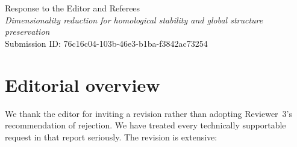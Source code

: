 \documentclass[11pt]{article}
\begin{document}
\begin{center}
{\Large Response to the Editor and Referees}\\[0.5em]
\emph{Dimensionality reduction for homological stability and global structure
preservation}\\
Submission ID: 76c16c04-103b-46e3-b1ba-f3842ac73254
\end{center}

\section*{Editorial overview}

We thank the editor for inviting a revision rather than adopting Reviewer~3's
recommendation of rejection. We have treated every technically supportable
request in that report seriously. The revision is extensive:
\end{document}

